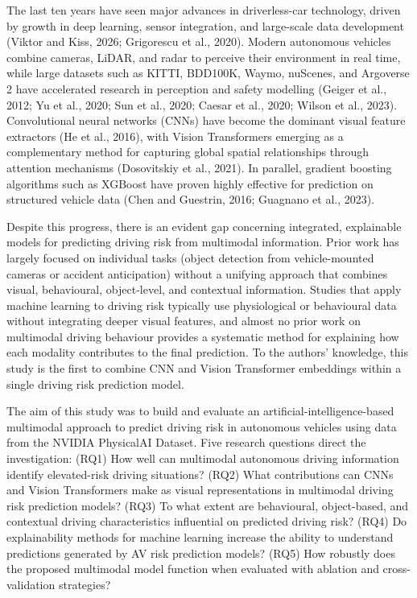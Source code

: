 \documentclass[11pt,a4paper]{article}
\begin{document}
The last ten years have seen major advances in driverless-car technology, driven by growth in deep learning, sensor integration, and large-scale data development (Viktor and Kiss, 2026; Grigorescu et al., 2020). Modern autonomous vehicles combine cameras, LiDAR, and radar to perceive their environment in real time, while large datasets such as KITTI, BDD100K, Waymo, nuScenes, and Argoverse 2 have accelerated research in perception and safety modelling (Geiger et al., 2012; Yu et al., 2020; Sun et al., 2020; Caesar et al., 2020; Wilson et al., 2023). Convolutional neural networks (CNNs) have become the dominant visual feature extractors (He et al., 2016), with Vision Transformers emerging as a complementary method for capturing global spatial relationships through attention mechanisms (Dosovitskiy et al., 2021). In parallel, gradient boosting algorithms such as XGBoost have proven highly effective for prediction on structured vehicle data (Chen and Guestrin, 2016; Guagnano et al., 2023).

Despite this progress, there is an evident gap concerning integrated, explainable models for predicting driving risk from multimodal information. Prior work has largely focused on individual tasks (object detection from vehicle-mounted cameras or accident anticipation) without a unifying approach that combines visual, behavioural, object-level, and contextual information. Studies that apply machine learning to driving risk typically use physiological or behavioural data without integrating deeper visual features, and almost no prior work on multimodal driving behaviour provides a systematic method for explaining how each modality contributes to the final prediction. To the authors' knowledge, this study is the first to combine CNN and Vision Transformer embeddings within a single driving risk prediction model.

The aim of this study was to build and evaluate an artificial-intelligence-based multimodal approach to predict driving risk in autonomous vehicles using data from the NVIDIA PhysicalAI Dataset. Five research questions direct the investigation: (RQ1) How well can multimodal autonomous driving information identify elevated-risk driving situations? (RQ2) What contributions can CNNs and Vision Transformers make as visual representations in multimodal driving risk prediction models? (RQ3) To what extent are behavioural, object-based, and contextual driving characteristics influential on predicted driving risk? (RQ4) Do explainability methods for machine learning increase the ability to understand predictions generated by AV risk prediction models? (RQ5) How robustly does the proposed multimodal model function when evaluated with ablation and cross-validation strategies?
\end{document}
